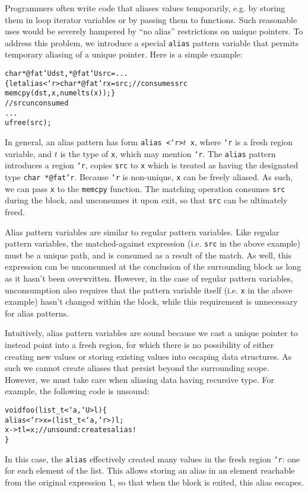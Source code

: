 Programmers often write code that aliases values temporarily, e.g. by
storing them in loop iterator variables or by passing them to functions.
Such reasonable uses would be severely hampered by ``no alias'' restrictions
on unique pointers.  To address this problem, we introduce a special
\texttt{alias} pattern variable that permits temporary aliasing of a unique
pointer.  Here is a simple example:
\begin{alltt}
  char *@fat`U dst, *@fat`U src = ...
  \{ let alias <`r>char *@fat`r x = src; // consumes src
    memcpy(dst,x,numelts(x)); \}
  // src unconsumed
  ...
  ufree(src);
\end{alltt}
In general, an alias pattern has form \texttt{alias <`r>$t$ x}, where
\texttt{`r} is a fresh region variable, and $t$ is the type of \texttt{x},
which may mention \texttt{`r}.  The \texttt{alias} pattern introduces a
region \texttt{`r}, copies \texttt{src} to \texttt{x} which is treated as
having the designated type \texttt{char *@fat`r}.  Because \texttt{`r} is
non-unique, \texttt{x} can be freely aliased.  As such, we can pass
\texttt{x} to the \texttt{memcpy} function.  The matching operation consumes
\texttt{src} during the block, and unconsumes it upon exit, so that
\texttt{src} can be ultimately freed.

Alias pattern variables are similar to regular pattern variables.  Like
regular pattern variables, the matched-against expression (i.e. \texttt{src}
in the above example) must be a unique path, and is consumed as a result of
the match.  As well, this expression can be unconsumed at the conclusion of
the surrounding block as long as it hasn't been overwritten.  However, in
the case of regular pattern variables, unconsumption also requires that the
pattern variable itself (i.e. \texttt{x} in the above example) hasn't
changed within the block, while this requirement is unnecessary for alias
patterns.

Intuitively, alias pattern variables are sound because we cast a unique
pointer to instead point into a fresh region, for which there is no
possibility of either creating new values or storing existing values into
escaping data structures.  As such we cannot create aliases that persist
beyond the surrounding scope.  However, we must take care when aliasing data
having recursive type.  For example, the following code is unsound:
\begin{alltt}
  void foo(list\_t<`a,`U> l) \{
    alias <`r> x = (list\_t<`a,`r>)l;
    x->tl = x; // unsound: creates alias!
  \}
\end{alltt}
In this case, the \texttt{alias} effectively created many values in the
fresh region \texttt{`r}: one for each element of the list.  This allows
storing an alias in an element reachable from the original expression
\texttt{l}, so that when the block is exited, this alias escapes.

